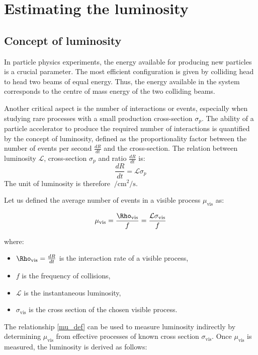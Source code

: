 \chapter{Estimating the luminosity}\label{chap:luminosity}

\section{Concept of luminosity}
In particle physics experiments, the energy available for producing new particles is a crucial parameter. The most efficient configuration is given by colliding head to head two beams of equal energy. Thus, the energy available in the system corresponds to the centre of mass energy of the two colliding beams.

Another critical aspect is the number of interactions or events, especially when studying rare processes with a small production cross-section $\sigma_p$. The ability of a particle accelerator to produce the required number of interactions is quantified by the concept of luminosity, defined as the proportionality factor between the number of events per second $\tfrac{dR}{dt}$ and the cross-section. The relation between luminosity $\mathcal{L}$, cross-section $\sigma_p$ and ratio $\tfrac{dR}{dt}$ is:
\begin{equation}
    \frac{dR}{dt} = \mathcal{L}{\sigma_p}\label{lumi_def}
\end{equation}
The unit of luminosity is therefore $\SI{}{\per\centi\meter\squared\per\second}$.
 
Let us defined the average number of events in a visible process $\mu_{\text{vis}}$ as:

\begin{equation}
\mu_{\text{vis}} = \frac{\Rho_{\text{vis}}}{f} = \frac{\mathcal{L} \sigma_{\text{vis}}}{f}\label{mu_def}
\end{equation}

where:
\begin{itemize}
\item  $\Rho_{\text{vis}}=\tfrac{dR}{dt}$ is the interaction rate of a visible process,
\item  $f$ is the frequency of collisions,
\item  $\mathcal{L}$ is the instantaneous luminosity,
\item  $\sigma_{\text{vis}}$ is the cross section of the chosen visible process.
\end{itemize}
The relationship \eqref{mu_def} can be used to measure luminosity indirectly by determining $\mu_{\text{vis}}$ from effective processes of known cross section $\sigma_\text{vis}$.
Once $\mu_{\text{vis}}$ is measured, the luminosity is derived as follows:

